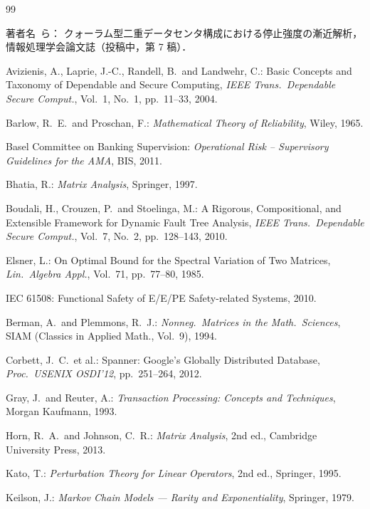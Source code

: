 \documentclass[12pt,a4paper]{article}
\theoremstyle{plain}
\theoremstyle{definition}
\theoremstyle{remark}
\begin{document}
\begin{thebibliography}{99}

  著者名~ら：
  クォーラム型二重データセンタ構成における停止強度の漸近解析，
  情報処理学会論文誌（投稿中，第 7 稿）．

  Avizienis, A., Laprie, J.-C., Randell, B.\ and Landwehr, C.:
  Basic Concepts and Taxonomy of Dependable and Secure Computing,
  \textit{IEEE Trans.\ Dependable Secure Comput.}, Vol.~1, No.~1, pp.~11--33, 2004.

  Barlow, R.~E.\ and Proschan, F.:
  \textit{Mathematical Theory of Reliability}, Wiley, 1965.

  Basel Committee on Banking Supervision:
  \textit{Operational Risk -- Supervisory Guidelines for the AMA},
  BIS, 2011.

  Bhatia, R.:
  \textit{Matrix Analysis}, Springer, 1997.

  Boudali, H., Crouzen, P.\ and Stoelinga, M.:
  A Rigorous, Compositional, and Extensible Framework for Dynamic Fault Tree Analysis,
  \textit{IEEE Trans.\ Dependable Secure Comput.}, Vol.~7, No.~2, pp.~128--143, 2010.

  Elsner, L.:
  On Optimal Bound for the Spectral Variation of Two Matrices,
  \textit{Lin.\ Algebra Appl.}, Vol.~71, pp.~77--80, 1985.

  IEC 61508: Functional Safety of E/E/PE Safety-related Systems, 2010.


  Berman, A.\ and Plemmons, R.~J.:
  \textit{Nonneg.\ Matrices in the Math.\ Sciences},
  SIAM (Classics in Applied Math., Vol.~9), 1994.

  Corbett, J.~C.\ et al.:
  Spanner: Google's Globally Distributed Database,
  \textit{Proc.\ USENIX OSDI'12}, pp.~251--264, 2012.

  Gray, J.\ and Reuter, A.:
  \textit{Transaction Processing: Concepts and Techniques},
  Morgan Kaufmann, 1993.

  Horn, R.~A.\ and Johnson, C.~R.:
  \textit{Matrix Analysis}, 2nd ed., Cambridge University Press, 2013.

  Kato, T.:
  \textit{Perturbation Theory for Linear Operators}, 2nd ed., Springer, 1995.

  Keilson, J.:
  \textit{Markov Chain Models --- Rarity and Exponentiality}, Springer, 1979.


\end{thebibliography}
\end{document}
